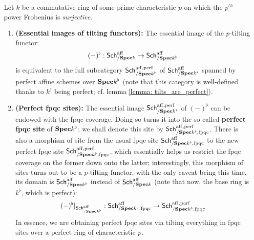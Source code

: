                     \begin{lemma} \label{lemma: perfect_fpqc_sites}
                        Let $k$ be a commutative ring of some prime characteristic $p$ on which the $p^{th}$ power Frobenius is \textit{surjective}.
                            \begin{enumerate}
                                \item \textbf{(Essential images of tilting functors):} The essential image of the $p$-tilting functor:
                                    $$(-)^{\flat}: \mathsf{Sch}^{\mathrm{aff}}_{/\mathbf{Spec} k} \to \mathsf{Sch}^{\mathrm{aff}}_{/\mathbf{Spec} k^{\flat}}$$
                                is equivalent to the full subcategory $\mathsf{Sch}^{\mathrm{aff}, \mathrm{perf}}_{/\mathbf{Spec} k^{\flat}}$ of $\mathsf{Sch}^{\mathrm{aff}}_{/\mathbf{Spec} k^{\flat}}$ spanned by perfect affine schemes over $\mathbf{Spec} k^{\flat}$ (note that this category is well-defined thanks to $k^{\flat}$ being perfect; cf. lemma \ref{lemma: tilts_are_perfect}).
                                \item \textbf{(Perfect fpqc sites):} The essential image $\mathsf{Sch}^{\mathrm{aff}, \mathrm{perf}}_{/\mathbf{Spec} k^{\flat}}$ of $(-)^{\flat}$ can be endowed with the fpqc coverage. Doing so turns it into the so-called \textbf{perfect fpqc site} of $\mathbf{Spec} k^{\flat}$; we shall denote this site by $\mathsf{Sch}^{\mathrm{aff}, \mathrm{perf}}_{/\mathbf{Spec} k^{\flat}, \mathrm{fpqc}}$. There is also a morphism of site from the usual fpqc site $\mathsf{Sch}^{\mathrm{aff}}_{/\mathbf{Spec} k^{\flat}. \mathrm{fpqc}}$ to the new perfect fpqc site $\mathsf{Sch}^{\mathrm{aff}, \mathrm{perf}}_{/\mathbf{Spec} k^{\flat}, \mathrm{fpqc}}$, which essentially helps us restrict the fpqc coverage on the former down onto the latter; interestingly, this morphism of sites turns out to be a $p$-tilting functor, with the only caveat being this time, its domain is $\mathsf{Sch}^{\mathrm{aff}}_{/\mathbf{Spec} k^{\flat}}$ instead of $\mathsf{Sch}^{\mathrm{aff}}_{/\mathbf{Spec} k}$ (note that now, the base ring is $k^{\flat}$, which is perfect):
                                    $$(-)^{\flat}|_{\mathsf{Sch}^{\mathrm{aff}}_{/\mathbf{Spec} k^{\flat}}}: \mathsf{Sch}^{\mathrm{aff}}_{/\mathbf{Spec} k^{\flat}, \mathrm{fpqc}} \to \mathsf{Sch}^{\mathrm{aff}, \mathrm{perf}}_{/\mathbf{Spec} k^{\flat}, \mathrm{fpqc}}$$
                                In essence, we are obtaining perfect fpqc sites via tilting everything in fpqc sites over a perfect ring of characteristic $p$.
                            \end{enumerate}
                    \end{lemma}
